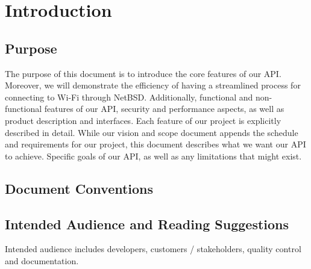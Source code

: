 \section{Introduction}

\subsection{Purpose}

The purpose of this document is to introduce the core features of our API. Moreover, we will demonstrate the efficiency 
of having a streamlined process for connecting to Wi-Fi through NetBSD. Additionally, functional and non-functional features 
of our API, security and performance aspects, as well as product description and interfaces. Each feature of our project is 
explicitly described in detail. While our vision and scope document appends the schedule and requirements for our project, this 
document describes what we want our API to achieve. Specific goals of our API, as well as any limitations that might exist. 

\subsection{Document Conventions}

\subsection{Intended Audience and Reading Suggestions}

Intended audience includes developers, customers / stakeholders, quality control and documentation. 

